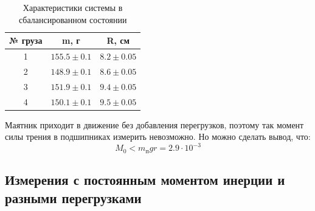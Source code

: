 \documentclass[a4paper,12pt]{article} %
\begin{document}
\begin{table}
\caption{Характеристики системы в сбалансированном состоянии}
\begin{tabular}{|c|c|c|}
\hline 
№ груза & m, г & R, см \\ 
\hline 
1 & $155.5\pm 0.1$ & $8.2\pm 0.05$ \\ 
\hline 
2 & $148.9\pm 0.1$ & $8.6\pm 0.05$ \\ 
\hline 
3 & $151.9\pm 0.1$ & $9.4\pm 0.05$ \\ 
\hline 
4 & $150.1\pm 0.1$ & $9.5\pm 0.05$ \\ 
\hline 
\end{tabular} 
\end{table}
Маятник приходит в движение без добавления перегрузков, поэтому так момент силы трения в подшипниках измерить невозможно. Но можно сделать вывод, что:
\begin{equation}
M_0 < m_\text{п}gr = 2.9 \cdot 10^{-3}
\end{equation}

\subsection{Измерения с постоянным моментом инерции и разными перегрузками}
\end{document}
